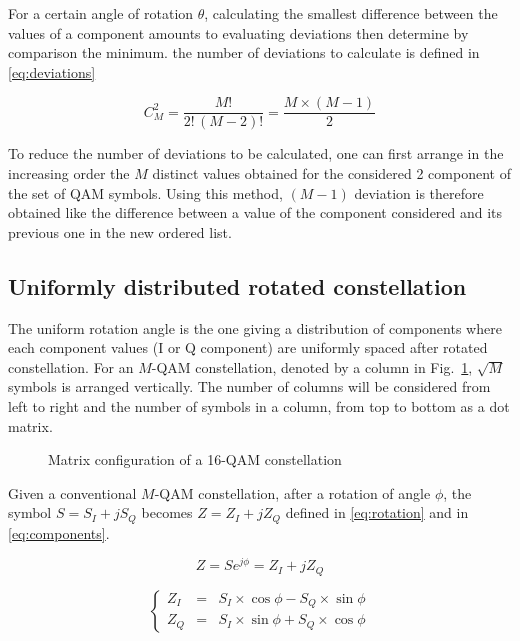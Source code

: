 For a certain angle of rotation $\theta$, calculating the smallest
difference between the values of a component amounts to evaluating
deviations then determine by comparison the minimum. the number of
deviations to calculate is defined in \eqref{eq:deviations}

\begin{equation}
  C_M^2 = \frac{M!}{2!\,(M-2)!} = \frac{M \times (M-1)}{2}
  \label{eq:deviations}
\end{equation}

To reduce the number of deviations to be calculated, one can first arrange
in the increasing order the $M$ distinct values obtained for the considered
2 component of the set of QAM symbols. Using this method, $(M-1)$ deviation
is therefore obtained like the difference between a value of the component
considered and its previous one in the new ordered list.

\subsection{Uniformly distributed rotated constellation}
\label{subsec:uniform}

The uniform rotation angle is the one giving a distribution of components
where each component values (I or Q component) are uniformly spaced after
rotated constellation. For an $M$-QAM constellation, denoted by a column in
Fig.~\ref{fig:matrix-16qam}, $\sqrt{M}$ symbols is arranged vertically. The
number of columns will be considered from left to right and the number of
symbols in a column, from top to bottom as a dot matrix.

\begin{figure}[!t]
  \centering
  
  \caption{Matrix configuration of a 16-QAM constellation}
  \label{fig:matrix-16qam}
\end{figure}

Given a conventional $M$-QAM constellation, after a rotation of angle
$\phi$, the symbol $S = S_I + jS_Q$ becomes $Z = Z_I + jZ_Q$ defined in
\eqref{eq:rotation} and in \eqref{eq:components}.

\begin{equation}
  Z = S e^{j\phi} = Z_I + jZ_Q
  \label{eq:rotation}
\end{equation}

\begin{equation}
  \left\{
  \begin{array}{rcl}
    Z_I & = & S_I \times \cos\phi - S_Q \times \sin\phi \\
    Z_Q & = & S_I \times \sin\phi + S_Q \times \cos\phi
  \end{array}
  \right.
  \label{eq:components}
\end{equation}


